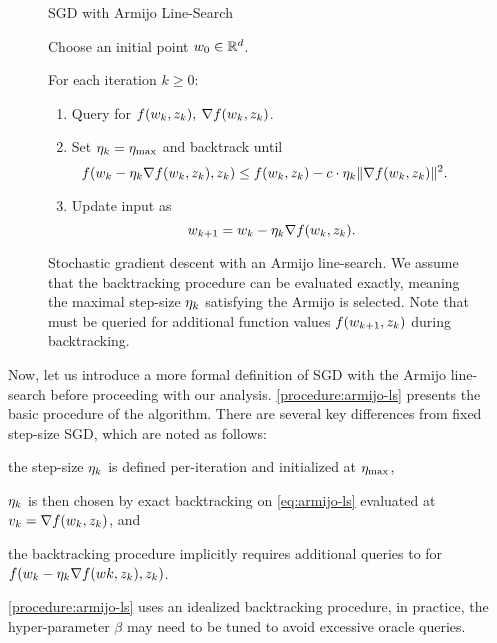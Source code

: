 \begin{figure}[t]
\begin{procedure}{\ac{SGD} with Armijo Line-Search}
\item Choose an initial point \( w_0 \in \mathbb{R}^d \).
\item For each iteration \( k \geq 0 \):
    \begin{enumerate}
        \item Query \oracle{} for \( f(w_k, z_{k}), \: \nabla f(w_k, z_{k}) \). 
        \item Set \( \eta_k =  \eta_{\text{max}} \) and backtrack until 
            \[  \hspace{-1em} f(w_k - \eta_k \nabla f(w_k, z_{k}), z_{k}) \leq f(w_k, z_{k}) - c \cdot \eta_k \|\nabla f(w_k, z_{k})\|^2. \]
        \item Update input as\vspace{-1ex}%
            \[ w_{k+1} = w_k - \eta_k \nabla f(w_k, z_{k}). \]
    \end{enumerate}
\end{procedure}
\caption{Stochastic gradient descent with an Armijo line-search. We assume that the backtracking procedure can be evaluated exactly, meaning the maximal step-size \( \eta_k \) satisfying the Armijo is selected. Note that \oracle{} must be queried for additional function values \( f(w_{k+1}, z_{k}) \) during backtracking.}%
\label{procedure:armijo-ls}
\end{figure}

Now, let us introduce a more formal definition of \ac{SGD} with the Armijo line-search before proceeding with our analysis.
\autoref{procedure:armijo-ls} presents the basic procedure of the algorithm.
There are several key differences from fixed step-size \ac{SGD}, which are noted as follows:
\begin{inparaenum}[i)]
    \item the step-size \( \eta_k \) is defined per-iteration and initialized at \( \eta_{\text{max}} \),
    \item \( \eta_k \) is then chosen by exact backtracking on \autoref{eq:armijo-ls} evaluated at \( v_k = \nabla f(w_k, z_{k}) \), and
    \item the backtracking procedure implicitly requires additional queries to \oracle{} for \( f(w_k - \eta_k \nabla f(wk, z_{k}), z_{k}) \).
\end{inparaenum}
\autoref{procedure:armijo-ls} uses an idealized backtracking procedure, in practice, the hyper-parameter \( \beta \) may need to be tuned to avoid excessive oracle queries. 


